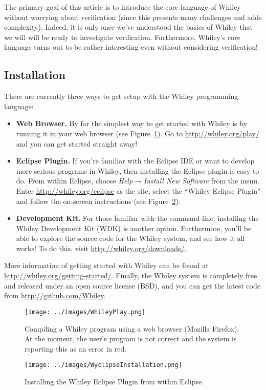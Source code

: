 The primary goal of this article is to introduce the core language of
Whiley without worrying about verification (since this presents many
challenges and adds complexity).  Indeed, it is only once we've
understood the basics of Whiley that we will will be ready to
investigate verification.  Furthermore, Whiley's core language turns
out to be rather interesting even without considering verification!

\subsection{Installation}

There are currently three ways to get setup with the Whiley
programming language:

\begin{itemize}
\item {\bf Web Browser.} By far the simplest way to get started with
  Whiley is by running it in your web browser (see
  Figure~\ref{whileyplay}).  Go to \url{http://whiley.org/play/} and
  you can get started straight away!
\item {\bf Eclipse Plugin.} If you're familiar with the Eclipse IDE or
  want to develop more serious programs in Whiley, then installing the
  Eclipse plugin is easy to do.  From within Eclipse, choose {\em
    Help$\rightarrow$Install New Software} from the menu.  Enter
  \url{http://whiley.org/eclipse} as the site, select the ``Whiley
  Eclipse Plugin'' and follow the on-screen instructions (see Figure~\ref{wyclipseinstall}).
\item {\bf Development Kit.} For those familiar with the command-line,
  installing the Whiley Development Kit (WDK) is another option.
  Furthermore, you'll be able to explore the source code for the
  Whiley system, and see how it all works!  To do this, visit
  \url{http://whiley.org/downloads/}.
\end{itemize}

More information of getting started with Whiley can be found at
\url{http://whiley.org/getting-started/}.  Finally, the Whiley system
is completely free and released under an open source license (BSD),
and you can get the latest code from \url{http://github.com/Whiley}.

\begin{figure}[!p]
\centering
\texttt{[image: ../images/WhileyPlay.png]}
\caption{Compiling a Whiley program using a web browser (Mozilla
  Firefox).  At the moment, the user's program is not correct and the
  system is reporting this as an error in red.}
\label{whileyplay}
\end{figure}

\begin{figure}[!p]
\centering
\texttt{[image: ../images/WyclipseInstallation.png]}
\caption{Installing the Whiley Eclipse Plugin from within Eclipse.}
\label{wyclipseinstall}
\end{figure}


